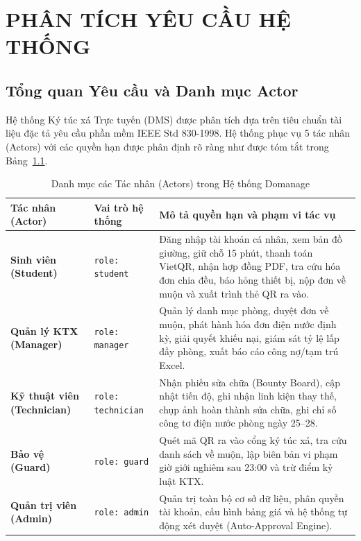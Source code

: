 \chapter{PHÂN TÍCH YÊU CẦU HỆ THỐNG}
\label{ch:requirements}

\section{Tổng quan Yêu cầu và Danh mục Actor}
Hệ thống Ký túc xá Trực tuyến (DMS) được phân tích dựa trên tiêu chuẩn tài liệu đặc tả yêu cầu phần mềm IEEE Std 830-1998. Hệ thống phục vụ 5 tác nhân (Actors) với các quyền hạn được phân định rõ ràng như được tóm tắt trong Bảng~\ref{tab:actors}.

\begin{table}[htbp]
\centering
\caption{Danh mục các Tác nhân (Actors) trong Hệ thống Domanage}
\label{tab:actors}
\small
\begin{tabularx}{\textwidth}{|l|l|X|}
\hline
\rowcolor{blue!10}
\textbf{Tác nhân (Actor)} & \textbf{Vai trò hệ thống} & \textbf{Mô tả quyền hạn và phạm vi tác vụ} \\ \hline
\textbf{Sinh viên (Student)} & \texttt{role: student} & Đăng nhập tài khoản cá nhân, xem bản đồ giường, giữ chỗ 15 phút, thanh toán VietQR, nhận hợp đồng PDF, tra cứu hóa đơn chia đều, báo hỏng thiết bị, nộp đơn về muộn và xuất trình thẻ QR ra vào. \\ \hline
\textbf{Quản lý KTX (Manager)} & \texttt{role: manager} & Quản lý danh mục phòng, duyệt đơn về muộn, phát hành hóa đơn điện nước định kỳ, giải quyết khiếu nại, giám sát tỷ lệ lấp đầy phòng, xuất báo cáo công nợ/tạm trú Excel. \\ \hline
\textbf{Kỹ thuật viên (Technician)} & \texttt{role: technician} & Nhận phiếu sửa chữa (Bounty Board), cập nhật tiến độ, ghi nhận linh kiện thay thế, chụp ảnh hoàn thành sửa chữa, ghi chỉ số công tơ điện nước phòng ngày 25--28. \\ \hline
\textbf{Bảo vệ (Guard)} & \texttt{role: guard} & Quét mã QR ra vào cổng ký túc xá, tra cứu danh sách về muộn, lập biên bản vi phạm giờ giới nghiêm sau 23:00 và trừ điểm kỷ luật KTX. \\ \hline
\textbf{Quản trị viên (Admin)} & \texttt{role: admin} & Quản trị toàn bộ cơ sở dữ liệu, phân quyền tài khoản, cấu hình bảng giá và hệ thống tự động xét duyệt (Auto-Approval Engine). \\ \hline
\end{tabularx}
\end{table}

